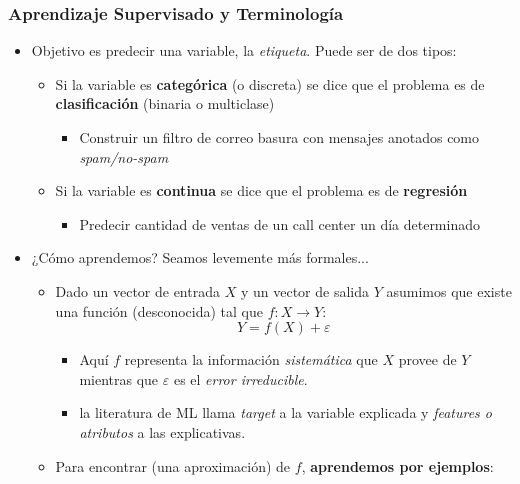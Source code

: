 \documentclass[leqno, 10pt, envcountsect]{beamer}
\numberwithin{equation}{section}
\theoremstyle{definition}
\theoremstyle{example}
\numberwithin{figure}{section}
\numberwithin{table}{section}
\let\olditem\item
\renewcommand{\item}{%
\olditem\vspace{1pt}}
\begin{document}
\begin{frame}[fragile=singleslide]
  \frametitle{Aprendizaje Supervisado y Terminología}
  \begin{itemize}
    \item Objetivo es predecir una variable, la \textit{etiqueta}. Puede ser de
      dos tipos:
      \begin{itemize}
        \item Si la variable es \textbf{categórica} (o discreta) se dice que el
          problema es de \textbf{clasificación} (binaria o multiclase)
          \begin{itemize}
            \item Construir un filtro de correo basura con mensajes anotados
              como \textit{spam/no-spam}
          \end{itemize}
        \item Si la variable es \textbf{continua} se dice que el
          problema es de \textbf{regresión}
          \begin{itemize}
            \item Predecir cantidad de ventas de un call center un día
              determinado
          \end{itemize}
      \end{itemize}
    \item ¿Cómo aprendemos? Seamos levemente más formales...
      \begin{itemize}
        \item Dado un vector de entrada $X$ y un vector de salida $Y$
          asumimos que existe una función (desconocida) tal que $f: X \to Y$:
          \begin{equation*}
            Y = f(X) +  \varepsilon
          \end{equation*}
          \begin{itemize}
            \item Aquí $f$ representa la información \textit{sistemática} que
              $X$ provee de $Y$ mientras que $\varepsilon$ es el \textit{error
              irreducible}.
          \item la literatura de ML llama \textit{target} a la variable
            explicada y \textit{features o atributos} a las explicativas.
          \end{itemize}
        \item Para encontrar (una aproximación) de $f$, \textbf{aprendemos por
          ejemplos}:
          \begin{enumerate}

\end{enumerate}
\end{itemize}
\end{itemize}
\end{frame}
\end{document}
